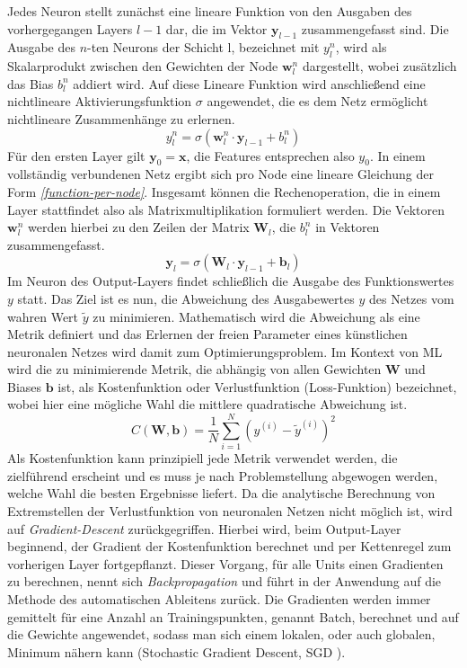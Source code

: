 Jedes Neuron stellt zunächst eine lineare Funktion von den Ausgaben des vorhergegangen Layers $l-1$ dar, die im Vektor $\mathbf{y}_{l-1}$ zusammengefasst sind. Die Ausgabe des $n$-ten Neurons der Schicht l, bezeichnet mit $y_l^n$, wird als Skalarprodukt zwischen den Gewichten der Node $\mathbf{w}_{l}^n$ dargestellt, wobei zusätzlich das Bias $b_l^n$ addiert wird. Auf diese Lineare Funktion wird anschließend eine nichtlineare Aktivierungsfunktion $\sigma$ angewendet, die es dem Netz ermöglicht nichtlineare Zusammenhänge zu erlernen.
\begin{equation}
y_l^n = \sigma\left(\mathbf{w}_{l}^n \cdot \mathbf{y}_{l-1} + b_{l}^n\right)
\label{function-per-node}
\end{equation}
Für den ersten Layer gilt  $\mathbf{y}_0 = \mathbf{x}$, die Features entsprechen also $y_0$. In einem vollständig verbundenen Netz ergibt sich pro Node eine lineare Gleichung der Form \textit{\autoref{function-per-node}}. Insgesamt können die Rechenoperation, die in einem Layer stattfindet also als Matrixmultiplikation formuliert werden. Die Vektoren $\mathbf{w}_{l}^n$ werden hierbei zu den Zeilen der Matrix $\mathbf{W}_l$, die  $b_{l}^n$ in Vektoren zusammengefasst.
\begin{equation}
\mathbf{y}_l = \sigma\left(\mathbf{W}_l\cdot \mathbf{y}_{l-1} + \mathbf{b}_l\right)
\end{equation}
Im Neuron des Output-Layers findet schließlich die Ausgabe des Funktionswertes $y$ statt. Das Ziel ist es nun, die Abweichung des Ausgabewertes $y$ des Netzes vom wahren Wert $\tilde{y}$ zu minimieren. Mathematisch wird die Abweichung als eine Metrik definiert und das Erlernen der freien Parameter eines künstlichen neuronalen Netzes wird damit zum Optimierungsproblem. Im Kontext von ML wird die zu minimierende Metrik, die abhängig von allen Gewichten $\mathbf{W}$ und Biases $\mathbf{b}$ ist, als Kostenfunktion oder Verlustfunktion (Loss-Funktion) bezeichnet, wobei hier eine mögliche Wahl die mittlere quadratische Abweichung ist.
\begin{equation}
C\left(\mathbf{W}, \mathbf{b}\right) = \frac{1}{N}\sum_{i=1}^{N}\left(y^{(i)} - \tilde{y}^{(i)}\right)^2
\end{equation}
Als Kostenfunktion kann prinzipiell jede Metrik verwendet werden, die zielführend erscheint und es muss je nach Problemstellung abgewogen werden, welche Wahl die besten Ergebnisse liefert.
Da die analytische Berechnung von Extremstellen der Verlustfunktion von neuronalen Netzen nicht möglich ist, wird auf \textit{Gradient-Descent} \cite{gradient-descent} zurückgegriffen. Hierbei wird, beim Output-Layer beginnend, der Gradient der Kostenfunktion berechnet und per Kettenregel zum vorherigen Layer fortgepflanzt. Dieser Vorgang, für alle Units einen Gradienten zu berechnen, nennt sich \textit{Backpropagation} und führt in der Anwendung auf die Methode des automatischen Ableitens zurück. Die Gradienten werden immer gemittelt für eine Anzahl an Trainingspunkten, genannt Batch, berechnet und auf die Gewichte angewendet, sodass man sich einem lokalen, oder auch globalen, Minimum nähern kann (Stochastic Gradient Descent, SGD \cite{sgd}).
